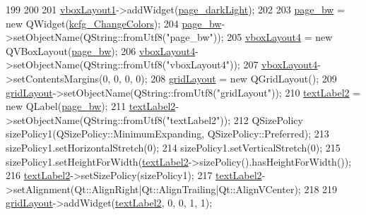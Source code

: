 \begin{DoxyCode}
199 
200 
201         \hyperlink{classUi__DlgAccessibilityBase_a83ac60339f9462b3a0571677794fae95}{vboxLayout1}->addWidget(\hyperlink{classUi__DlgAccessibilityBase_ac6a05225066cc7e921a37af4468a95df}{page\_darkLight});
202 
203         \hyperlink{classUi__DlgAccessibilityBase_ad6248c8c27f576cedc9e49b6144c4bc4}{page\_bw} = \textcolor{keyword}{new} QWidget(\hyperlink{classUi__DlgAccessibilityBase_ad69ec5ae9e5bad5756a57dac036500eb}{kcfg\_ChangeColors});
204         \hyperlink{classUi__DlgAccessibilityBase_ad6248c8c27f576cedc9e49b6144c4bc4}{page\_bw}->setObjectName(QString::fromUtf8(\textcolor{stringliteral}{"page\_bw"}));
205         \hyperlink{classUi__DlgAccessibilityBase_ae920274bca545ba85ff1578ed4317d56}{vboxLayout4} = \textcolor{keyword}{new} QVBoxLayout(\hyperlink{classUi__DlgAccessibilityBase_ad6248c8c27f576cedc9e49b6144c4bc4}{page\_bw});
206         \hyperlink{classUi__DlgAccessibilityBase_ae920274bca545ba85ff1578ed4317d56}{vboxLayout4}->setObjectName(QString::fromUtf8(\textcolor{stringliteral}{"vboxLayout4"}));
207         \hyperlink{classUi__DlgAccessibilityBase_ae920274bca545ba85ff1578ed4317d56}{vboxLayout4}->setContentsMargins(0, 0, 0, 0);
208         \hyperlink{classUi__DlgAccessibilityBase_a5f8944bbf69c844201c6fbfc3436c89b}{gridLayout} = \textcolor{keyword}{new} QGridLayout();
209         \hyperlink{classUi__DlgAccessibilityBase_a5f8944bbf69c844201c6fbfc3436c89b}{gridLayout}->setObjectName(QString::fromUtf8(\textcolor{stringliteral}{"gridLayout"}));
210         \hyperlink{classUi__DlgAccessibilityBase_a86309f7fdcc0194a41f39ae3bc98fa6e}{textLabel2} = \textcolor{keyword}{new} QLabel(\hyperlink{classUi__DlgAccessibilityBase_ad6248c8c27f576cedc9e49b6144c4bc4}{page\_bw});
211         \hyperlink{classUi__DlgAccessibilityBase_a86309f7fdcc0194a41f39ae3bc98fa6e}{textLabel2}->setObjectName(QString::fromUtf8(\textcolor{stringliteral}{"textLabel2"}));
212         QSizePolicy sizePolicy1(QSizePolicy::MinimumExpanding, QSizePolicy::Preferred);
213         sizePolicy1.setHorizontalStretch(0);
214         sizePolicy1.setVerticalStretch(0);
215         sizePolicy1.setHeightForWidth(\hyperlink{classUi__DlgAccessibilityBase_a86309f7fdcc0194a41f39ae3bc98fa6e}{textLabel2}->sizePolicy().hasHeightForWidth());
216         \hyperlink{classUi__DlgAccessibilityBase_a86309f7fdcc0194a41f39ae3bc98fa6e}{textLabel2}->setSizePolicy(sizePolicy1);
217         \hyperlink{classUi__DlgAccessibilityBase_a86309f7fdcc0194a41f39ae3bc98fa6e}{textLabel2}->setAlignment(Qt::AlignRight|Qt::AlignTrailing|Qt::AlignVCenter);
218 
219         \hyperlink{classUi__DlgAccessibilityBase_a5f8944bbf69c844201c6fbfc3436c89b}{gridLayout}->addWidget(\hyperlink{classUi__DlgAccessibilityBase_a86309f7fdcc0194a41f39ae3bc98fa6e}{textLabel2}, 0, 0, 1, 1);

\end{DoxyCode}
